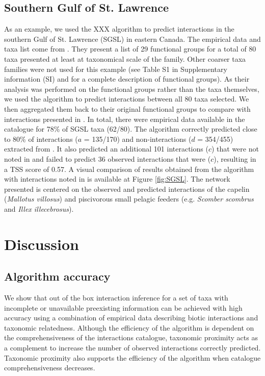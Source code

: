 \documentclass[letterpaper]{article}
\begin{document}
    \subsection{Southern Gulf of St. Lawrence}
As an example, we used the XXX algorithm to predict interactions in the southern Gulf of St. Lawrence (SGSL) in eastern Canada. The empirical data and taxa list come from \citet{Savenkoff2004}. They present a list of 29 functional groups for a total of 80 taxa presented at least at taxonomical scale of the family. Other coarser taxa families were not used for this example (see Table S1 in Supplementary information (SI) and \citet{Savenkoff2004} for a complete description of functional groups). As their analysis was performed on the functional groups rather than the taxa themselves, we used the algorithm to predict interactions between all 80 taxa selected. We then aggregated them back to their original functional groups to compare with interactions presented in \citet{Savenkoff2004}. In total, there were empirical data available in the catalogue for 78\% of SGSL taxa (62/80). The algorithm correctly predicted close to 80\% of interactions ($a$ = 135/170) and non-interactions ($d$ = 354/455) extracted from \citet{Savenkoff2004}. It also predicted an additional 101 interactions ($c$) that were not noted in \citet{Savenkoff2004} and failed to predict 36 observed interactions that were ($c$), resulting in a TSS score of 0.57. A visual comparison of results obtained from the algorithm with interactions noted in \citet{Savenkoff2004} is available at Figure \ref{fig:SGSL}. The network presented is centered on the observed and predicted interactions of the capelin (\textit{Mallotus villosus}) and piscivorous small pelagic feeders (e.g. \textit{Scomber scombrus} and \textit{Illex illecebrosus}).


\section{Discussion}
\subsection{Algorithm accuracy}
We show that out of the box interaction inference for a set of taxa with incomplete or unavailable preexisting information can be achieved with high accuracy using a combination of empirical data describing biotic interactions and taxonomic relatedness. Although the efficiency of the algorithm is dependent on the comprehensiveness of the interactions catalogue, taxonomic proximity acts as a complement to increase the number of observed interactions correctly predicted. Taxonomic proximity also supports the efficiency of the algorithm when catalogue comprehensiveness decreases.
\end{document}
